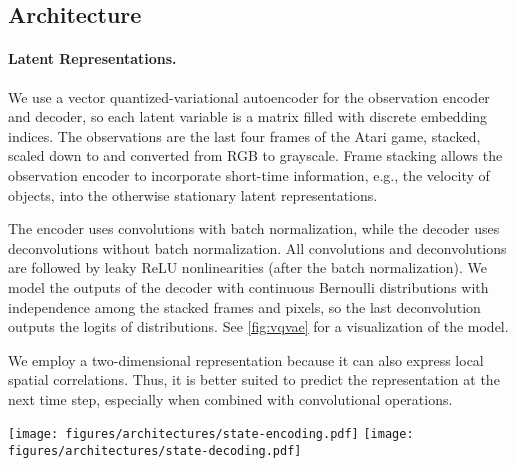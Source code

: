 \documentclass{article}
\begin{document}
\subsection{Architecture}

\paragraph{Latent Representations.}
We use a vector quantized-variational autoencoder \cite{vq-vae} for the
observation encoder and decoder, so each latent variable  is a matrix
filled with discrete embedding indices. The observations  are the last four
frames of the Atari game, stacked, scaled down to  and converted
from RGB to grayscale. Frame stacking allows the observation encoder to
incorporate short-time information, e.g., the velocity of objects, into the
otherwise stationary latent representations.

The encoder uses convolutions with batch normalization, while the decoder uses
deconvolutions without batch normalization. All convolutions and deconvolutions
are followed by leaky ReLU nonlinearities (after the batch normalization). We
model the outputs of the decoder with continuous Bernoulli distributions
\cite{continuous-bernoulli} with independence among the stacked frames and
pixels, so the last deconvolution outputs the logits of 
distributions. See \cref{fig:vqvae} for a visualization of the model.

We employ a two-dimensional representation because it can also express local
spatial correlations. Thus, it is better suited to predict the representation at
the next time step, especially when combined with convolutional operations.

\begin{figure*}[t]
  \texttt{[image: figures/architectures/state-encoding.pdf]}
\vskip -1.2in
  \hfill
  \texttt{[image: figures/architectures/state-decoding.pdf]}
\caption{Visualization of the observation encoder architecture (top) and
		decoder architecture (bottom).}
	\label{fig:vqvae}
\end{figure*}
\end{document}
